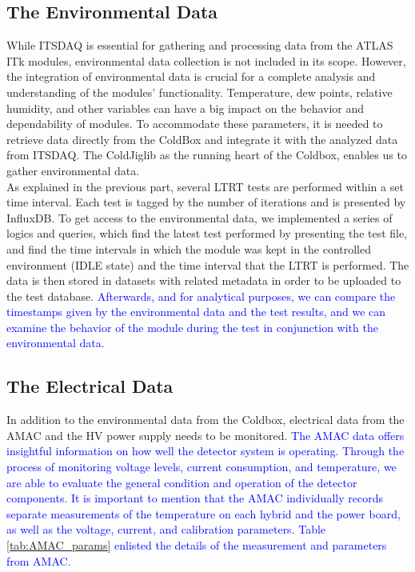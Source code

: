 \subsection{The Environmental Data}
While ITSDAQ is essential for gathering and processing data from the ATLAS ITk modules, environmental data collection is not included in its scope. However, the integration of environmental data is crucial for a complete analysis and understanding of the modules' functionality. Temperature, dew points, relative humidity, and other variables can have a big impact on the behavior and dependability of modules. To accommodate these parameters, it is needed to retrieve data directly from the ColdBox and integrate it with the analyzed data from ITSDAQ. The ColdJiglib as the running heart of the Coldbox, enables us to gather environmental data. \\

As explained in the previous part, several LTRT tests are performed within a set time interval. Each test is tagged by the number of iterations and is presented by InfluxDB. To get access to the environmental data, we implemented a series of logics and queries, which find the latest test performed by presenting the test file, and find the time intervals in which the module was kept in the controlled environment (IDLE state) and the time interval that the LTRT is performed. The data is then stored in datasets with related metadata in order to be uploaded to the test database. \textcolor{blue}{ Afterwards, and for analytical purposes, we can compare the timestamps given by the environmental data and the test results, and we can examine the behavior of the module during the test in conjunction with the environmental data.}


\subsection{The Electrical Data}
In addition to the environmental data from the Coldbox, electrical data from the AMAC and the HV power supply needs to be monitored.\textcolor{blue}{ The AMAC data offers insightful information on how well the detector system is operating. Through the process of monitoring voltage levels, current consumption, and temperature, we are able to evaluate the general condition and operation of the detector components. It is important to mention that the AMAC individually records separate measurements of the temperature on each hybrid and the power board, as well as the voltage, current, and calibration parameters. Table \ref{tab:AMAC_params} enlisted the details of the measurement and parameters from AMAC.} 


